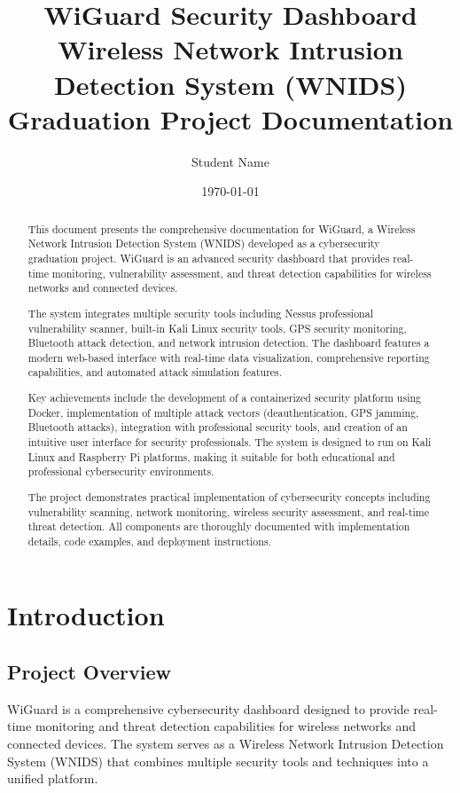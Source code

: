 \documentclass[12pt,a4paper]{report}
\title{\textbf{WiGuard Security Dashboard}\\
       \large{Wireless Network Intrusion Detection System (WNIDS)}\\
       \large{Graduation Project Documentation}}
\author{Student Name}
\date{\today}
\begin{document}
\maketitle

\tableofcontents
\listoffigures
\listoftables

\begin{abstract}
This document presents the comprehensive documentation for WiGuard, a Wireless Network Intrusion Detection System (WNIDS) developed as a cybersecurity graduation project. WiGuard is an advanced security dashboard that provides real-time monitoring, vulnerability assessment, and threat detection capabilities for wireless networks and connected devices.

The system integrates multiple security tools including Nessus professional vulnerability scanner, built-in Kali Linux security tools, GPS security monitoring, Bluetooth attack detection, and network intrusion detection. The dashboard features a modern web-based interface with real-time data visualization, comprehensive reporting capabilities, and automated attack simulation features.

Key achievements include the development of a containerized security platform using Docker, implementation of multiple attack vectors (deauthentication, GPS jamming, Bluetooth attacks), integration with professional security tools, and creation of an intuitive user interface for security professionals. The system is designed to run on Kali Linux and Raspberry Pi platforms, making it suitable for both educational and professional cybersecurity environments.

The project demonstrates practical implementation of cybersecurity concepts including vulnerability scanning, network monitoring, wireless security assessment, and real-time threat detection. All components are thoroughly documented with implementation details, code examples, and deployment instructions.
\end{abstract}

\chapter{Introduction}

\section{Project Overview}

WiGuard is a comprehensive cybersecurity dashboard designed to provide real-time monitoring and threat detection capabilities for wireless networks and connected devices. The system serves as a Wireless Network Intrusion Detection System (WNIDS) that combines multiple security tools and techniques into a unified platform.
\end{document}
